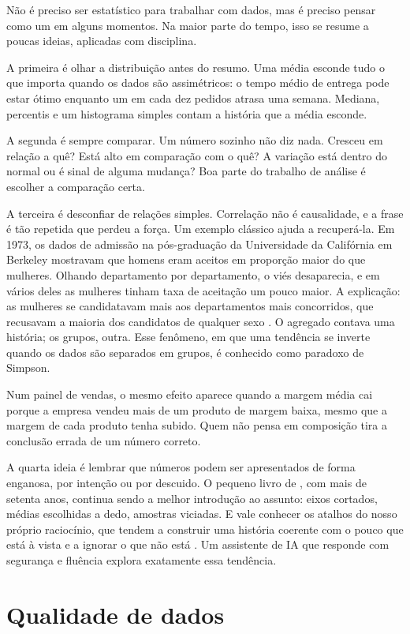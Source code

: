 Não é preciso ser estatístico para trabalhar com dados, mas é preciso pensar como um em
alguns momentos. Na maior parte do tempo, isso se resume a poucas ideias, aplicadas com
disciplina.

A primeira é olhar a distribuição antes do resumo. Uma média esconde tudo o que importa
quando os dados são assimétricos: o tempo médio de entrega pode estar ótimo enquanto um
em cada dez pedidos atrasa uma semana. Mediana, percentis e um histograma simples contam a
história que a média esconde.

A segunda é sempre comparar. Um número sozinho não diz nada. Cresceu em relação a quê? Está
alto em comparação com o quê? A variação está dentro do normal ou é sinal de alguma
mudança? Boa parte do trabalho de análise é escolher a comparação certa.

A terceira é desconfiar de relações simples. Correlação não é causalidade, e a frase é tão
repetida que perdeu a força. Um exemplo clássico ajuda a recuperá-la. Em 1973, os dados de
admissão na pós-graduação da Universidade da Califórnia em Berkeley mostravam que homens
eram aceitos em proporção maior do que mulheres. Olhando departamento por departamento, o
viés desaparecia, e em vários deles as mulheres tinham taxa de aceitação um pouco maior. A
explicação: as mulheres se candidatavam mais aos departamentos mais concorridos, que
recusavam a maioria dos candidatos de qualquer sexo \parencite{bickel1975}. O agregado
contava uma história; os grupos, outra. Esse fenômeno, em que uma tendência se inverte
quando os dados são separados em grupos, é conhecido como paradoxo de Simpson.

Num painel de vendas, o mesmo efeito aparece quando a margem média cai porque a empresa
vendeu mais de um produto de margem baixa, mesmo que a margem de cada produto tenha subido.
Quem não pensa em composição tira a conclusão errada de um número correto.

A quarta ideia é lembrar que números podem ser apresentados de forma enganosa, por
intenção ou por descuido. O pequeno livro de \textcite{huff1954}, com mais de setenta anos,
continua sendo a melhor introdução ao assunto: eixos cortados, médias escolhidas a dedo,
amostras viciadas. E vale conhecer os atalhos do nosso próprio raciocínio, que tendem a
construir uma história coerente com o pouco que está à vista e a ignorar o que não está
\parencite{kahneman2011}. Um assistente de IA que responde com segurança e fluência explora
exatamente essa tendência.

\section{Qualidade de dados}
\label{sec:fund-qualidade}

